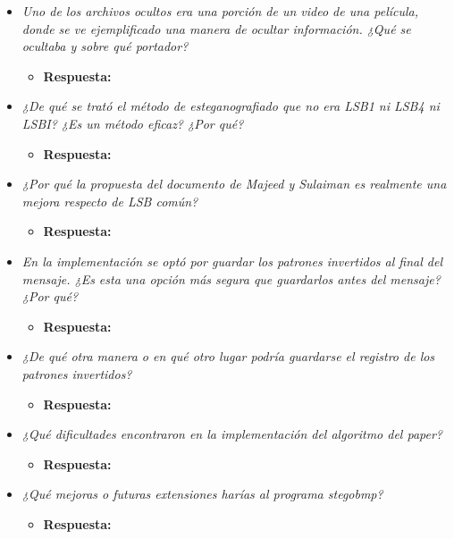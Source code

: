 \documentclass[a4paper,12pt]{article}
\begin{document}
\begin{itemize}
		\item \textit{Uno de los archivos ocultos era una porción de un video de una película, donde se ve ejemplificado una manera de ocultar información. ¿Qué se ocultaba y sobre qué portador?}
		\begin{itemize}
			\item \textbf{Respuesta:} 
		\end{itemize}
		
		\item \textit{¿De qué se trató el método de esteganografiado que no era LSB1 ni LSB4 ni LSBI? ¿Es un método eficaz? ¿Por qué?}
		\begin{itemize}
			\item \textbf{Respuesta:} 
		\end{itemize}
		
		\item \textit{¿Por qué la propuesta del documento de Majeed y Sulaiman es realmente una mejora respecto de LSB común?}
		\begin{itemize}
			\item \textbf{Respuesta:} 
		\end{itemize}
		
		\item \textit{En la implementación se optó por guardar los patrones invertidos al final del mensaje. ¿Es esta una opción más segura que guardarlos antes del mensaje? ¿Por qué?}
		\begin{itemize}
			\item \textbf{Respuesta:} 
		\end{itemize}
		
		\item \textit{¿De qué otra manera o en qué otro lugar podría guardarse el registro de los patrones invertidos?}
		\begin{itemize}
			\item \textbf{Respuesta:} 
		\end{itemize}
		
		\item \textit{¿Qué dificultades encontraron en la implementación del algoritmo del paper?}
		\begin{itemize}
			\item \textbf{Respuesta:} 
		\end{itemize}
		
		\item \textit{¿Qué mejoras o futuras extensiones harías al programa stegobmp?}
		\begin{itemize}
			\item \textbf{Respuesta:} 
		\end{itemize}
	\end{itemize}
	
\end{document}
